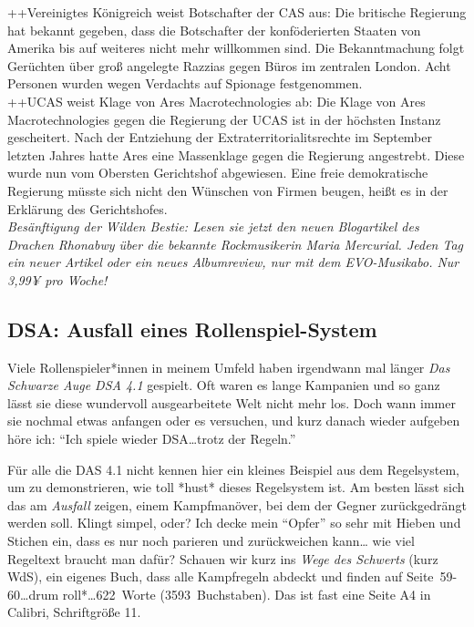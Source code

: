 \documentclass[final]{multiversum}
\begin{document}
++Vereinigtes Königreich weist Botschafter der CAS aus: Die britische Regierung
hat bekannt gegeben, dass die Botschafter der konföderierten Staaten von Amerika
bis auf weiteres nicht mehr willkommen sind. Die Bekanntmachung folgt Gerüchten
über groß angelegte Razzias gegen Büros im zentralen London. Acht Personen
wurden wegen Verdachts auf Spionage festgenommen.\\
\indent ++UCAS weist Klage von Ares Macrotechnologies ab: Die Klage von Ares
Macrotechnologies gegen die Regierung der UCAS ist in der höchsten Instanz
gescheitert. Nach der Entziehung der Extraterritorialitsrechte im September
letzten Jahres hatte Ares eine Massenklage gegen die Regierung angestrebt. Diese
wurde nun vom Obersten Gerichtshof abgewiesen. Eine freie demokratische
Regierung müsste sich nicht den Wünschen von Firmen beugen, heißt es in der
Erklärung des Gerichtshofes.\\
\indent \textit{Besänftigung der Wilden Bestie: Lesen sie jetzt den neuen
Blogartikel des Drachen Rhonabwy über die bekannte Rockmusikerin Maria
Mercurial. Jeden Tag ein neuer Artikel oder ein neues Albumreview, nur mit dem
EVO-Musikabo. Nur 3,99¥ pro Woche!}


\subsection{DSA: Ausfall eines Rollenspiel-System}
 Viele Rollenspieler*innen in meinem Umfeld haben irgendwann mal länger
\emph{Das Schwarze Auge DSA 4.1} gespielt. Oft waren es lange Kampanien und so
ganz lässt sie diese wundervoll ausgearbeitete Welt nicht mehr los. Doch wann
immer sie nochmal etwas anfangen  \textendash{} oder es versuchen, und kurz
danach wieder aufgeben  \textendash{} höre ich: \enquote{Ich spiele wieder
DSA\ldots trotz der Regeln.}

Für alle die DAS 4.1 nicht kennen hier ein kleines Beispiel aus dem Regelsystem,
um zu demonstrieren, wie toll *hust* dieses Regelsystem ist. Am besten lässt
sich das am \emph{Ausfall} zeigen, einem Kampfmanöver, bei dem der Gegner
zurückgedrängt werden soll. Klingt simpel, oder? Ich decke mein \enquote{Opfer}
so sehr mit Hieben und Stichen ein, dass es nur noch parieren und zurückweichen
kann\ldots{} wie viel Regeltext braucht man dafür? Schauen wir kurz ins \emph{Wege des
Schwerts} (kurz WdS), ein eigenes Buch, dass alle Kampfregeln abdeckt und finden
auf Seite~59-60\ldots *drum roll*\ldots 622~Worte (3593~Buchstaben). Das ist fast eine
Seite A4 in Calibri, Schriftgröße 11.
\end{document}
